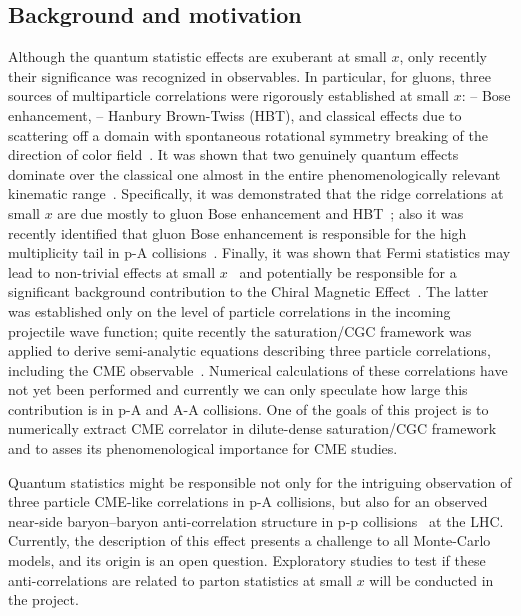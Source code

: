     \vspace{0.5em}
    \subsection{Background and motivation}
    \label{sec:p3b}
	Although the quantum statistic effects are exuberant at small $x$, 
	only recently their significance was recognized in observables. 
	In particular, 
	for gluons, three sources of multiparticle  correlations were rigorously established at 
	small $x$: -- Bose enhancement, -- Hanbury Brown-Twiss (HBT), and classical effects due to 
	scattering off a domain with spontaneous rotational symmetry breaking of the direction of 
	color field~\cite{Dumitru:2014yza,Dumitru:2014vka,Dumitru:2015cfa}. It was shown that two genuinely quantum effects dominate over the classical one 
	almost in the entire phenomenologically relevant kinematic range~\cite{Kovner:2018azs}.
	Specifically, it was demonstrated that the ridge correlations at small $x$ are 
	due mostly to gluon Bose enhancement and 
	HBT~\cite{Kovchegov:2013ewa,Kovchegov:2012nd,Altinoluk:2015uaa,Altinoluk:2018ogz,Kovner:2018fxj,Kovchegov:2018jun};
	also  it was recently identified 
	that gluon Bose enhancement is responsible for the high multiplicity tail in p-A collisions~\cite{Kovner:2018azs}. 
	Finally, it was shown that Fermi statistics may lead to non-trivial effects at small $x$~\cite{Altinoluk:2016vax,Kovner:2017ssr,Kovner:2018vec} 
and potentially be responsible for a significant background contribution to the Chiral Magnetic Effect~\cite{Kovner:2017gab}. 
	The latter was established only on the level of particle correlations in the incoming projectile wave function; 
	quite recently the saturation/CGC framework was applied to derive semi-analytic equations describing 
	three particle correlations, including the CME observable~\cite{Martinez:2018tuf}. Numerical calculations of these 
	correlations have not yet been performed and currently we can only speculate how large 
	this contribution is in p-A and A-A collisions. One of the goals of this project is to 
	numerically extract CME correlator in dilute-dense saturation/CGC framework and to asses its phenomenological importance 
	for CME studies. 

	Quantum statistics might be responsible not only for the intriguing observation of three particle CME-like correlations 
	in p-A collisions, but also for an observed near-side baryon--baryon anti-correlation structure in p-p 
	collisions~\cite{Adam:2016iwf} at the LHC. Currently, the description of this effect presents a challenge 
	to all Monte-Carlo models, and its origin is an open question. Exploratory studies to test if these anti-correlations are 
    related to parton statistics at small $x$ will be conducted in the project.  


